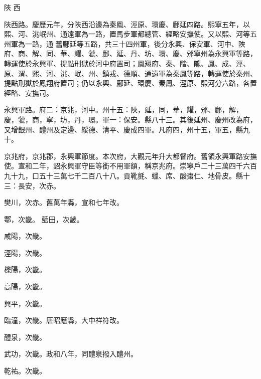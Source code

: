 
\begin{pinyinscope}

 陜
 西



 陜西路。慶歷元年，分陜西沿邊為秦鳳、涇原、環慶、鄜延四路。熙寧五年，以熙、河、洮岷州、通遠軍為一路，置馬步軍都總管、經略安撫使。又以熙、河等五州軍為一路，通
 舊鄜延等五路，共三十四州軍，後分永興、保安軍、河中、陜府、商、解、同、華、耀、虢、鄜、延、丹、坊、環、慶、邠寧州為永興軍等路，轉運使於永興軍、提點刑獄於河中府置司；鳳翔府、秦、階、隴、鳳、成、涇、原、渭、熙、河、洮、岷、州、鎮戎、德順、通遠軍為秦鳳等路，轉運使於秦州、提點刑獄於鳳翔府置司；仍以永興、鄜延、環慶、秦鳳、涇原、熙河分六路，各置經略、安撫司。



 永興軍路。府二：京兆，河中。州十五：陜，延，同，華，耀，邠、鄜，解，
 慶，虢，商，寧，坊，丹，環。軍一：保安。縣八十三。其後延州、慶州改為府，又增銀州、醴州及定邊、綏德、清平、慶成四軍。凡府四，州十五，軍五，縣九十。



 京兆府，京兆郡，永興軍節度。本次府，大觀元年升大都督府。舊領永興軍路安撫使。宣和二年，詔永興軍守臣等銜不用軍額，稱京兆府。崇寧戶二十三萬四千六百九十九，口五十三萬七千二百八十八。貢靴氈、蠟、席、酸棗仁、地骨皮。縣十三：長安，次赤。



 樊川，次赤。舊萬年縣，宣和七年改。



 鄠，次畿。
 藍田，次畿。



 咸陽，次畿。



 涇陽，次畿。



 櫟陽，次畿。



 高陽，次畿。



 興平，次畿。



 臨潼，次畿。唐昭應縣，大中祥符改。



 醴泉，次畿。



 武功，次畿。政和八年，同醴泉撥入醴州。



 乾祐。次畿。




\end{pinyinscope}
